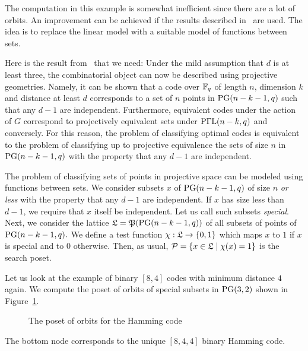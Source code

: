 \bigskip

The computation in this example is somewhat inefficient since there are a lot of orbits. 
An improvement can be achieved if the results described in~\cite{BettenCodes} are used. 
The idea is to replace the linear model with a suitable model of functions between sets.


\bigskip



Here is the result from~\cite{BettenCodes} that we need:
Under the mild assumption that $d$ is at least three, 
the combinatorial object can now be described using projective geometries.
Namely, it can be shown that a code over ${\mathbb F}_q$ 
of length $n$, dimension $k$ and distance at least $d$ 
corresponds to a set of $n$ points 
in ${\rm PG}(n-k-1,q)$ such that any $d-1$ are independent. 
Furthermore, 
equivalent codes under the action of $G$ correspond 
to projectively equivalent sets under ${\rm P}\Gamma{\rm L}(n-k,q)$ and conversely. 
For this reason, the problem of classifying optimal codes 
is equivalent to the problem of classifying up to projective equivalence
the sets of size $n$ in ${\rm PG}(n-k-1,q)$  
with the property that any $d-1$ are independent.

\bigskip

The problem of classifying sets of points in projective space can be modeled using 
functions between sets.
We consider 
subsets $x$ of ${\rm PG}(n-k-1,q)$ 
of size $n$ {\em or less} 
with the property that any $d-1$ are independent. 
If $x$ has size less than $d-1$, we require that $x$ itself be independent.
Let us call such subsets {\em special}.
Next, we consider the lattice ${\mathfrak L} = {\mathfrak P}({\rm PG}(n-k-1,q))$ 
of all subsets of points of ${\rm PG}(n-k-1,q).$ 
We define a test function $\chi: {\mathfrak L} \rightarrow \{0,1\}$ 
which maps $x$ to $1$ if $x$ is special and to $0$ otherwise. 
Then, as usual, ${\cal P} = \{ x \in {\mathfrak L} \mid \chi(x) = 1 \}$ is the search poset.

\bigskip

Let us look at  the example of binary $[8,4]$ codes with minimum distance $4$ again. 
We compute the poset of orbits 
of special subsets in ${\rm PG}(3,2)$ shown in Figure~\ref{fig:hamming}.
\begin{figure}
\begin{center}
 
\end{center}
\caption{\label{fig:hamming}The poset of orbits for the Hamming code}
\end{figure}
The bottom node corresponds to the unique $[8,4,4]$ binary Hamming code.

